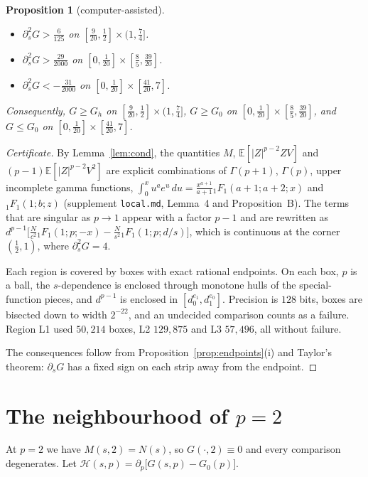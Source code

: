 \documentclass[11pt]{article}
\newtheorem{proposition}[theorem]{Proposition}
\theoremstyle{remark}
\newcommand{\E}{\mathbb E}
\begin{document}
\begin{proposition}[computer-assisted]\label{prop:local}
\begin{itemize}
\item[(L1)] $\partial_s^2G>\frac{6}{125}$ on $[\frac9{20},\frac12]\times(1,\frac74]$.
\item[(L2)] $\partial_s^2G>\frac{29}{2000}$ on $[0,\frac1{20}]\times[\frac85,\frac{39}{20}]$.
\item[(L3)] $\partial_s^2G<-\frac{31}{2000}$ on $[0,\frac1{20}]\times[\frac{41}{20},7]$.
\end{itemize}
Consequently, $G\ge G_h$ on $[\frac9{20},\frac12]\times(1,\frac74]$, $G\ge G_0$ on $[0,\frac1{20}]\times[\frac85,\frac{39}{20}]$, and $G\le G_0$ on $[0,\frac1{20}]\times[\frac{41}{20},7]$.
\end{proposition}
\begin{proof}[Certificate]
By Lemma~\ref{lem:cond}, the quantities $M$, $\E[|Z|^{p-2}ZV]$ and $(p-1)\E[|Z|^{p-2}V^2]$ are explicit combinations of $\Gamma(p+1)$, $\Gamma(p)$, upper incomplete gamma functions, $\int_0^xu^ae^u\,du=\frac{x^{a+1}}{a+1}{}_1F_1(a+1;a+2;x)$ and ${}_1F_1(1;b;z)$ (supplement \texttt{local.md}, Lemma~4 and Proposition~B). The terms that are singular as $p\to1$ appear with a factor $p-1$ and are rewritten as $d^{p-1}\bigl[\frac N{c^2}{}_1F_1(1;p;-x)-\frac N{s^2}{}_1F_1(1;p;d/s)\bigr]$, which is continuous at the corner $(\frac12,1)$, where $\partial_s^2G=4$.

Each region is covered by boxes with exact rational endpoints. On each box, $p$ is a ball, the $s$-dependence is enclosed through monotone hulls of the special-function pieces, and $d^{p-1}$ is enclosed in $[d_0^{e_1},d_1^{e_0}]$. Precision is $128$ bits, boxes are bisected down to width $2^{-22}$, and an undecided comparison counts as a failure. Region L1 used $50{,}214$ boxes, L2 $129{,}875$ and L3 $57{,}496$, all without failure.

The consequences follow from Proposition~\ref{prop:endpoints}(i) and Taylor's theorem: $\partial_sG$ has a fixed sign on each strip away from the endpoint.
\end{proof}


\section{The neighbourhood of $p=2$}\label{sec:strip}
At $p=2$ we have $M(s,2)=N(s)$, so $G(\cdot,2)\equiv0$ and every comparison degenerates. Let $\mathcal H(s,p)=\partial_p\bigl[G(s,p)-G_0(p)\bigr]$.
\end{document}
